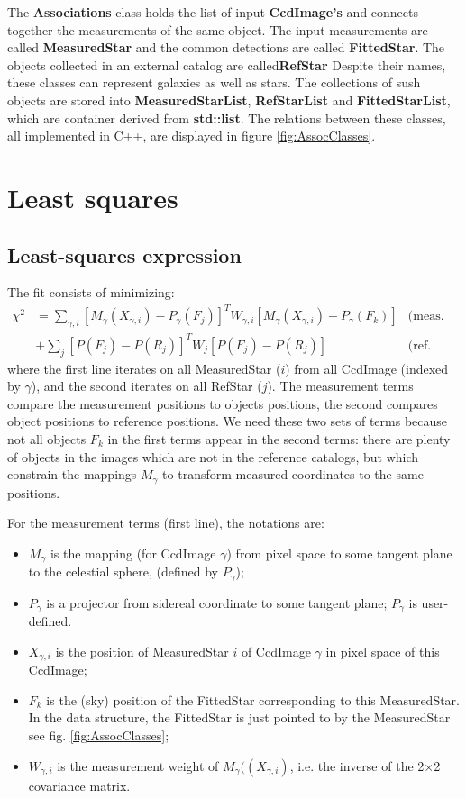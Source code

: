\documentclass[a4paper,12pt]{scrartcl}
\newcommand{\ClName}[1]{{\bf #1}}
\def\bf{\normalfont\bfseries}
\begin{document}
The \ClName{Associations} class holds the list of input
\ClName{CcdImage's} and connects together the measurements of the same
object. The input measurements are called \ClName{MeasuredStar} and
the common detections are called \ClName{FittedStar}. The objects
collected in an external catalog are called\ClName{RefStar}
Despite their
names, these classes can represent galaxies as well as stars. The
collections of sush objects are stored into \ClName{MeasuredStarList},
\ClName{RefStarList} 
and \ClName{FittedStarList}, which are container derived from \ClName
{std::list}. The relations between these classes, all implemented in C++,
are displayed in figure \ref{fig:AssocClasses}.


\section{Least squares \label{sec:ls}}
\subsection{Least-squares expression}
The fit consists of minimizing:
\begin{align}
\chi^2 & =  \sum_{\gamma,i}  [M_\gamma(X_{\gamma,i})-P_{\gamma}(F_j) ]^T W_{\gamma,i}  [M_\gamma(X_{\gamma,i})-P_{\gamma}(F_k) ] & \textrm{(meas. terms)} \nonumber \\
         &+\sum_j [P(F_j)-P(R_j)]^T W_j [P(F_j)-P(R_j)] & \textrm{(ref. terms)} \label{eq:chi2}
\end{align}
where the first line iterates on all MeasuredStar ($i$) from all
CcdImage (indexed by $\gamma$), and the second iterates on all RefStar
($j$). The measurement terms compare the measurement positions
to objects positions, the second compares object positions 
to reference positions. We need these two sets of terms
because not all objects $F_k$ in the first terms appear
in the second terms: there are plenty of objects in the images
which are not in the reference catalogs, but which constrain the
mappings $M_\gamma$ to transform measured coordinates to the
same positions. 

For the measurement terms (first line), the notations are:
\begin{itemize}
\item $M_\gamma$ is the mapping (for CcdImage $\gamma$) from pixel space to
some tangent plane to the celestial sphere, (defined by $P_\gamma$);
\item $P_\gamma$ is a projector from sidereal coordinate to some tangent plane;
$P_\gamma$ is user-defined.
\item $X_{\gamma,i}$ is the position of MeasuredStar $i$ of CcdImage $\gamma$
in pixel space of this CcdImage;
\item $F_k$ is the (sky) position of the FittedStar corresponding 
to this MeasuredStar. In the data structure, the FittedStar is just pointed to 
by the MeasuredStar see fig. \ref{fig:AssocClasses};
\item $W_{\gamma,i}$ is the measurement weight of $M_\gamma((X_{\gamma,i})$, i.e.
the inverse of the 2$\times$2 covariance matrix.
\end{itemize}
\end{document}
